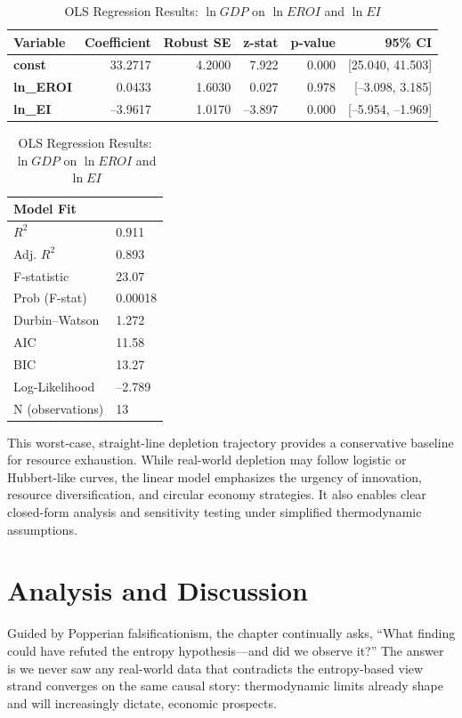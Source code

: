 \documentclass[a4paper,12pt]{article}
\begin{document}
\begin{table}[h!]
\centering
\caption{OLS Regression Results: $\ln GDP$ on $\ln EROI$ and $\ln EI$}
\label{tab:ols_results}
\begin{tabular}{lrrrrr}
\toprule
\textbf{Variable} & \textbf{Coefficient} & \textbf{Robust SE} & \textbf{z-stat} & \textbf{p-value} & \textbf{95\% CI} \\
\midrule
\textbf{const}      & 33.2717  & 4.2000  & 7.922 & 0.000 & [25.040, 41.503] \\
\textbf{ln\_EROI}   & 0.0433   & 1.6030  & 0.027 & 0.978 & [--3.098, 3.185] \\
\textbf{ln\_EI}     & --3.9617 & 1.0170  & --3.897 & 0.000 & [--5.954, --1.969] \\
\bottomrule
\end{tabular}

\vspace{0.5em}

\begin{tabular}{ll}
\textbf{Model Fit} & \\
\midrule
$R^2$              & 0.911 \\
Adj. $R^2$         & 0.893 \\
F-statistic        & 23.07 \\
Prob (F-stat)      & 0.00018 \\
Durbin–Watson      & 1.272 \\
AIC                & 11.58 \\
BIC                & 13.27 \\
Log-Likelihood     & --2.789 \\
N (observations)   & 13 \\
\bottomrule
\end{tabular}
\end{table}

This worst-case, straight-line depletion trajectory provides a conservative baseline for resource exhaustion. While real-world depletion may follow logistic or Hubbert-like curves, the linear model emphasizes the urgency of innovation, resource diversification, and circular economy strategies. It also enables clear closed-form analysis and sensitivity testing under simplified thermodynamic assumptions.

\section{Analysis and Discussion}
\label{sec:analysis}
Guided by Popperian falsificationism, the chapter continually asks, “What finding could have refuted the entropy hypothesis—and did we observe it?”  The answer is we never saw any real-world data that contradicts the entropy-based view strand converges on the same causal story: thermodynamic limits already shape and will increasingly dictate, economic prospects.
\end{document}

